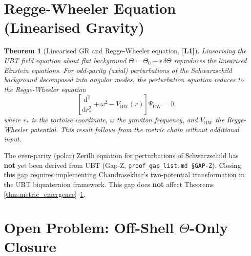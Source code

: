 \documentclass[12pt,a4paper]{article}
\newtheorem{theorem}{Theorem}[section]
\theoremstyle{definition}
\theoremstyle{remark}
\newcommand{\Lone}{\textbf{[L1]}}
\newcommand{\Ltwo}{\textbf{[L2]}}
\newcommand{\OPEN}{\textbf{[OPEN]}}
\begin{document}
\section{Regge-Wheeler Equation (Linearised Gravity)}
\label{sec:regge_wheeler}

\begin{theorem}[Linearised GR and Regge-Wheeler equation, \Lone]
\label{thm:regge_wheeler}
Linearising the UBT field equation about flat background
$\Theta = \Theta_0 + \epsilon\,\delta\Theta$ reproduces the linearised Einstein
equations.  For odd-parity (axial) perturbations of the Schwarzschild background
decomposed into angular modes, the perturbation equation reduces to the
Regge-Wheeler equation
\[
  \left[\frac{\mathrm{d}^2}{\mathrm{d}r_*^2} + \omega^2
        - V_{\mathrm{RW}}(r)\right]\Psi_{\mathrm{RW}} = 0,
\]
where $r_*$ is the tortoise coordinate, $\omega$ the graviton frequency, and
$V_{\mathrm{RW}}$ the Regge-Wheeler potential.
This result follows from the metric chain without additional input.
\end{theorem}

\begin{tcolorbox}[colback=orange!5!white,colframe=orange!60!black,
  title=Open problem: Zerilli equation (even-parity graviton) \OPEN~\Ltwo]
The even-parity (polar) Zerilli equation for perturbations of Schwarzschild has
\textbf{not} yet been derived from UBT (Gap-Z, \texttt{proof\_gap\_list.md~\S GAP-Z}).
Closing this gap requires implementing Chandrasekhar's two-potential transformation
in the UBT biquaternion framework.  This gap does \textbf{not} affect Theorems
\ref{thm:metric_emergence}--\ref{thm:regge_wheeler}.
\end{tcolorbox}

\section{Open Problem: Off-Shell $\Theta$-Only Closure}
\label{sec:gap}
\end{document}

